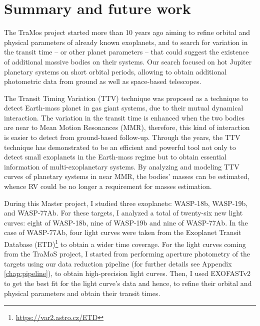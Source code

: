 \chapter{Summary and future work}\label{chap:conclusion}

The TraMos project started more than 10 years ago aiming to refine orbital and physical parameters of already known exoplanets, and to search for variation in the transit time -- or other planet parameters -- that could suggest the existence of additional massive bodies on their systems. Our search focused on hot Jupiter planetary systems on short orbital periods, allowing to obtain additional photometric data from ground as well as space-based telescopes. 


The Transit Timing Variation (TTV) technique was proposed as a technique to detect Earth-mass planet in gas giant systems, due to their mutual dynamical interaction. The variation in the transit time is enhanced when the two bodies are near to Mean Motion Resonances (MMR), therefore, this kind of interaction is easier to detect from ground-based follow-up. Through the years, the TTV technique has demonstrated to be an efficient and powerful tool not only to detect small exoplanets in the Earth-mass regime but to obtain essential information of multi-exoplanetary systems. By analyzing and modeling TTV curves of planetary systems in near MMR, the bodies' masses can be estimated, whence RV could be no longer a requirement for masses estimation.

During this Master project, I studied three exoplanets: WASP-18b, WASP-19b, and WASP-77Ab. For these targets, I analyzed a total of twenty-six new light curves: eight of WASP-18b, nine of WASP-19b and nine of WASP-77Ab. In the case of WASP-77Ab, four light curves were taken from the Exoplanet Transit Database (ETD)\footnote{\url{https://var2.astro.cz/ETD}} to obtain a wider time coverage. For the light curves coming from the TraMoS project, I started from performing aperture photometry of the targets using our data reduction pipeline (for further details see Appendix \ref{chap:pipeline}), to obtain high-precision light curves. Then, I used EXOFASTv2 \cite{Eastman2013,Eastman2017} to get the best fit for the light curve's data and hence, to refine their orbital and physical parameters and obtain their transit times.

